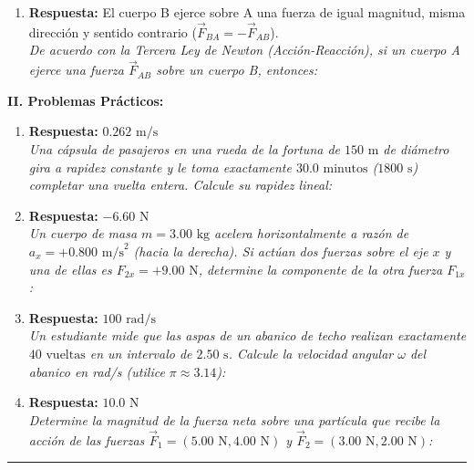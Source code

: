 \documentclass[11pt,a4paper]{article}
\begin{document}
\begin{enumerate}
    \item \textbf{Respuesta:} El cuerpo B ejerce sobre A una fuerza de igual magnitud, misma dirección y sentido contrario ($\vec{F}_{BA} = -\vec{F}_{AB}$). \\ \textit{De acuerdo con la Tercera Ley de Newton (Acción-Reacción), si un cuerpo A ejerce una fuerza $\vec{F}_{AB}$ sobre un cuerpo B, entonces:}
\end{enumerate}\textbf{II. Problemas Prácticos:}\begin{enumerate}    \item \textbf{Respuesta:} $0.262 \text{ m/s}$ \\ \textit{Una cápsula de pasajeros en una rueda de la fortuna de $150 \text{ m}$ de diámetro gira a rapidez constante y le toma exactamente $30.0 \text{ minutos}$ ($1800 \text{ s}$) completar una vuelta entera. Calcule su rapidez lineal:}
    \item \textbf{Respuesta:} $-6.60 \text{ N}$ \\ \textit{Un cuerpo de masa $m = 3.00 \text{ kg}$ acelera horizontalmente a razón de $a_x = +0.800 \text{ m/s}^2$ (hacia la derecha). Si actúan dos fuerzas sobre el eje $x$ y una de ellas es $F_{2x} = +9.00 \text{ N}$, determine la componente de la otra fuerza $F_{1x}$:}
    \item \textbf{Respuesta:} $100 \text{ rad/s}$ \\ \textit{Un estudiante mide que las aspas de un abanico de techo realizan exactamente $40 \text{ vueltas}$ en un intervalo de $2.50 \text{ s}$. Calcule la velocidad angular $\omega$ del abanico en rad/s (utilice $\pi \approx 3.14$):}
    \item \textbf{Respuesta:} $10.0 \text{ N}$ \\ \textit{Determine la magnitud de la fuerza neta sobre una partícula que recibe la acción de las fuerzas $\vec{F}_1 = (5.00 \text{ N}, 4.00 \text{ N})$ y $\vec{F}_2 = (3.00 \text{ N}, 2.00 \text{ N})$:}
\end{enumerate}\vspace{0.4cm} \hrule \vspace{0.4cm}
\end{document}
